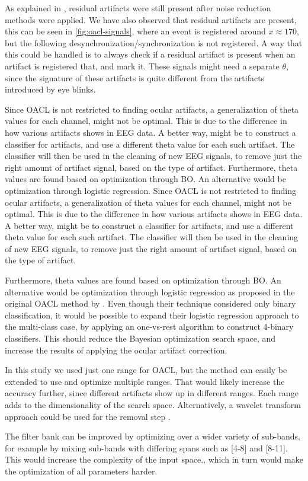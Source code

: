 As explained in \cite{hoffmann2008correction}, residual artifacts were still present after noise reduction methods were applied. We have also observed that residual artifacts are present, this can be seen in \cref{fig:oacl-signals}, where an event is registered around $x \approx 170$, but the following desynchronization/synchronization is not registered. A way that this could be handled is to always check if a residual artifact is present when an artifact is registered that, and mark it. These signals might need a separate $\theta$, since the signature of these artifacts is quite different from the artifacts introduced by eye blinks.

Since OACL is not restricted to finding ocular artifacts, a generalization of theta values for each channel, might not be optimal. This is due to the difference in how various artifacts shows in EEG data. A better way, might be to construct a classifier for artifacts, and use a different theta value for each such artifact. The classifier will then be used in the cleaning of new EEG signals, to remove just the right amount of artifact signal, based on the type of artifact. Furthermore, theta values are found based on optimization through BO. An alternative would be optimization through logistic regression. 
Since OACL is not restricted to finding ocular artifacts, a generalization of theta values for each channel, might not be optimal. This is due to the difference in how various artifacts shows in EEG data. A better way, might be to construct a classifier for artifacts, and use a different theta value for each such artifact. The classifier will then be used in the cleaning of new EEG signals, to remove just the right amount of artifact signal, based on the type of artifact. 

Furthermore, theta values are found based on optimization through BO. An alternative would be optimization through logistic regression as proposed in the original OACL method by \citet{li2015ocular}. Even though their technique considered only binary classification, it would be possible to expand their logistic regression approach to the multi-class case, by applying an one-vs-rest algorithm to construct 4-binary classifiers. This should reduce the Bayesian optimization search space, and increase the results of applying the ocular artifact correction.

In this study we used just one range for OACL, but the method can easily be extended to use and optimize multiple ranges. That would likely increase the accuracy further, since different artifacts show up in different ranges. Each range adds to the dimensionality of the search space. Alternatively, a wavelet transform approach could be used for the removal step \citep{krishnaveni2006automatic}.

The filter bank can be improved by optimizing over a wider variety of sub-bands, for example by mixing sub-bands with differing spans such as [4-8] and [8-11]. This would increase the complexity of the input space., which in turn would make the optimization of all parameters harder. 